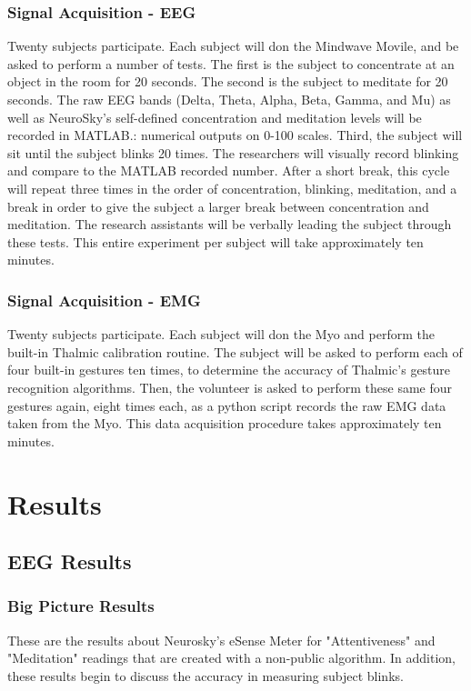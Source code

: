\documentclass[journal]{IEEEtran}
\begin{document}
\subsubsection{Signal Acquisition - EEG}
Twenty subjects participate. Each subject will don the Mindwave Movile, and be asked to perform a number of tests. The first is the subject to concentrate at an object in the room for 20 seconds. The second is the subject to meditate for 20 seconds. The raw EEG bands (Delta, Theta, Alpha, Beta, Gamma, and Mu) as well as NeuroSky’s self-defined concentration and meditation levels will be recorded in MATLAB.: numerical outputs on 0-100 scales. Third, the subject will sit until the subject blinks 20 times. The researchers will visually record blinking and compare to the MATLAB recorded number. After a short break, this cycle will repeat three times in the order of concentration, blinking, meditation, and a break in order to give the subject a larger break between concentration and meditation. The research assistants will be verbally leading the subject through these tests. This entire experiment per subject will take approximately ten minutes.

\subsubsection{Signal Acquisition - EMG}
Twenty subjects participate. Each subject will don the Myo and perform the built-in Thalmic calibration routine. The subject will be asked to perform each of four built-in gestures ten times, to determine the accuracy of Thalmic's gesture recognition algorithms. Then, the volunteer is asked to perform these same four gestures again, eight times each, as a python script records the raw EMG data taken from the Myo. This data acquisition procedure takes approximately ten minutes.



\section{Results}
\subsection{EEG Results} \par
\subsubsection{Big Picture Results}
These are the results about Neurosky's eSense Meter for "Attentiveness" and "Meditation" readings that are created with a non-public algorithm. In addition, these results begin to discuss the accuracy in measuring subject blinks.
\end{document}
